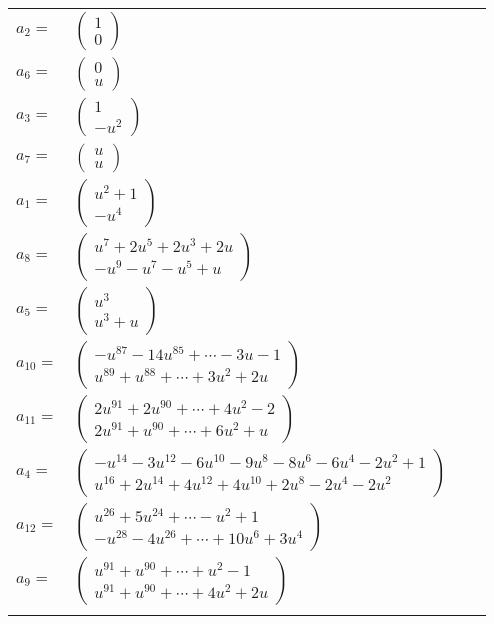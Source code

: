 \documentclass[1p]{elsarticle_modified}
\theoremstyle{definition}
\begin{document}
\begin{tabular}{m{7pt} m{180pt} m{7pt} m{180pt} }
\flushright $a_{2}=$&$\begin{pmatrix}1\\0\end{pmatrix}$ \\
\flushright $a_{6}=$&$\begin{pmatrix}0\\u\end{pmatrix}$ \\
\flushright $a_{3}=$&$\begin{pmatrix}1\\- u^2\end{pmatrix}$ \\
\flushright $a_{7}=$&$\begin{pmatrix}u\\u\end{pmatrix}$ \\
\flushright $a_{1}=$&$\begin{pmatrix}u^2+1\\- u^4\end{pmatrix}$ \\
\flushright $a_{8}=$&$\begin{pmatrix}u^7+2 u^5+2 u^3+2 u\\- u^9- u^7- u^5+u\end{pmatrix}$ \\
\flushright $a_{5}=$&$\begin{pmatrix}u^3\\u^3+u\end{pmatrix}$ \\
\flushright $a_{10}=$&$\begin{pmatrix}- u^{87}-14 u^{85}+\cdots-3 u-1\\u^{89}+u^{88}+\cdots+3 u^2+2 u\end{pmatrix}$ \\
\flushright $a_{11}=$&$\begin{pmatrix}2 u^{91}+2 u^{90}+\cdots+4 u^2-2\\2 u^{91}+u^{90}+\cdots+6 u^2+u\end{pmatrix}$ \\
\flushright $a_{4}=$&$\begin{pmatrix}- u^{14}-3 u^{12}-6 u^{10}-9 u^8-8 u^6-6 u^4-2 u^2+1\\u^{16}+2 u^{14}+4 u^{12}+4 u^{10}+2 u^8-2 u^4-2 u^2\end{pmatrix}$ \\
\flushright $a_{12}=$&$\begin{pmatrix}u^{26}+5 u^{24}+\cdots- u^2+1\\- u^{28}-4 u^{26}+\cdots+10 u^6+3 u^4\end{pmatrix}$ \\
\flushright $a_{9}=$&$\begin{pmatrix}u^{91}+u^{90}+\cdots+u^2-1\\u^{91}+u^{90}+\cdots+4 u^2+2 u\end{pmatrix}$\\&\end{tabular}
\end{document}
